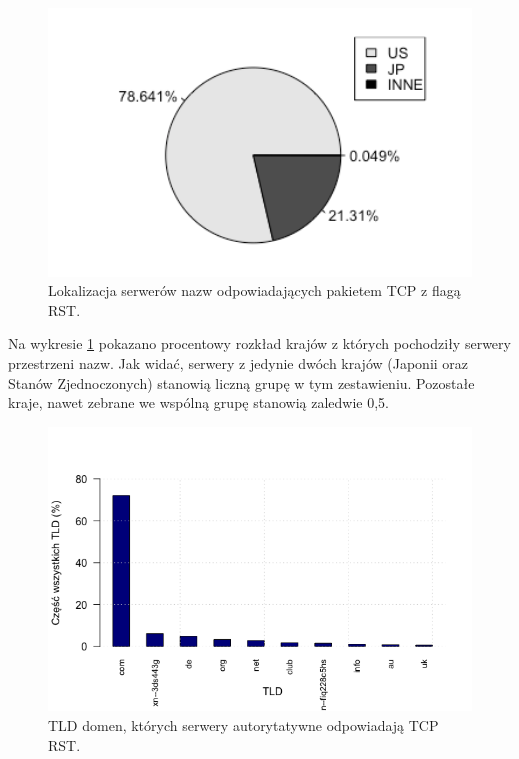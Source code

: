 \begin{figure}[h]
\centering
\includegraphics[width=1.0\textwidth]{image/unused_pie_no_title}
\caption{Lokalizacja serwerów nazw odpowiadających pakietem TCP z flagą RST.}
\label{fig:unused_pie}
\end{figure}

Na wykresie \ref{fig:unused_pie} pokazano procentowy rozkład krajów z których pochodziły serwery przestrzeni nazw. Jak widać,
serwery z jedynie dwóch krajów (Japonii oraz Stanów Zjednoczonych) stanowią liczną grupę w tym zestawieniu. Pozostałe kraje, nawet
zebrane we wspólną grupę stanowią zaledwie 0,5\textperthousand.

\begin{figure}[h]
\centering
\includegraphics[width=1.0\textwidth]{image/unused_tld}
\caption{TLD domen, których serwery autorytatywne odpowiadają TCP RST.}
\label{fig:unused_tld}
\end{figure}

